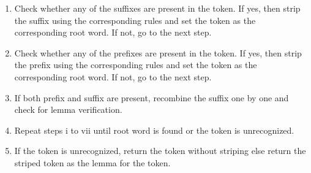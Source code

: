 \documentclass[conference]{IEEEtran}
\begin{document}
\begin{enumerate}
\begin{enumerate}
    \item  Check whether any of the suffixes are present in the token. If yes,
      then strip the suffix using the corresponding rules and set the token as
      the corresponding root word. If not, go to the next step.\medskip
    
    \item Check whether any of the prefixes are present in the token. If yes,
      then strip the prefix using the corresponding rules and set the token as
      the corresponding root word. If not, go to the next step.\medskip
    
    \item If both prefix and suffix are present, recombine the suffix one by one
      and check for lemma verification.\medskip
     
    \item Repeat steps i to vii until root word is found or the token is
      unrecognized.\medskip
    
    \item If the token is unrecognized, return the token without striping else
      return the striped token as the lemma for the token.\medskip
    
\end{enumerate}
\end{enumerate}
\end{document}
